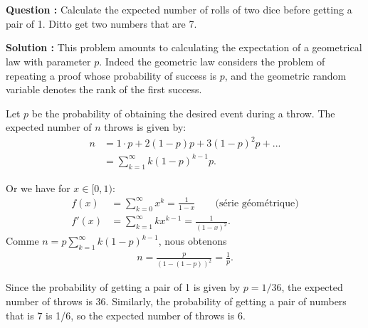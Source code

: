 \documentclass[11pt]{article} %
\newenvironment{question}[1][\unskip]{%
	\par
	\noindent
	\textbf{Question #1:}
	\noindent}
{\medskip}
\newenvironment{solution}[1][\unskip]{%
	\par
	\noindent
	\textbf{Solution #1:}
	\noindent}
{\medskip}
\begin{document}
	\section{}
\begin{question}
		Calculate the expected number of rolls of two dice before getting a pair of 1. Ditto get two numbers that are 7.
	\end{question}
	\begin{solution}
		This problem amounts to calculating the expectation of a geometrical law with parameter $ p $. Indeed the geometric law considers the problem of repeating a proof whose probability of success is $ p $, and the geometric random variable denotes the rank of the first success.

		Let $p$ be the probability of obtaining the desired event during a throw. The expected number of $n$ throws is given by:
		\begin{align*}
		n &= 1\cdot p + 2(1-p)p + 3 (1-p)^2 p + ...\\
		&=\sum_{k=1}^{\infty}k(1-p)^{k-1}p.
		\end{align*}

		Or we have for $x\in [0,1)$:
		\begin{align*}
		f(x)&=\sum_{k=0}^{\infty}x^k= \frac{1}{1-x} \qquad \text{(série géométrique)}\\
		f'(x)&=\sum_{k=1}^{\infty}kx^{k-1}= \frac{1}{(1-x)^2}.
		\end{align*}
		Comme $n=p\sum_{k=1}^{\infty}k(1-p)^{k-1}$, nous obtenons
		\begin{align*}
		n=\frac{p}{(1-(1-p))^2}=\frac{1}{p}.
		\end{align*}
		
		Since the probability of getting a pair of 1 is given by $ p = 1/36 $, the expected number of throws is 36. Similarly, the probability of getting a pair of numbers that is 7 is 1/6, so the expected number of throws is 6.
	\end{solution}
	
	\newpage
\end{document}
